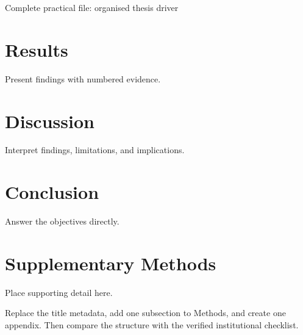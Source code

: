 \begin{latexcode}{Complete practical file: organised thesis driver}
\chapter{Results}
Present findings with numbered evidence.

\chapter{Discussion}
Interpret findings, limitations, and implications.

\chapter{Conclusion}
Answer the objectives directly.

\appendix
\chapter{Supplementary Methods}
Place supporting detail here.


\end{latexcode}

\begin{codelab}
Replace the title metadata, add one subsection to Methods, and create one
appendix. Then compare the structure with the verified institutional checklist.
\end{codelab}
